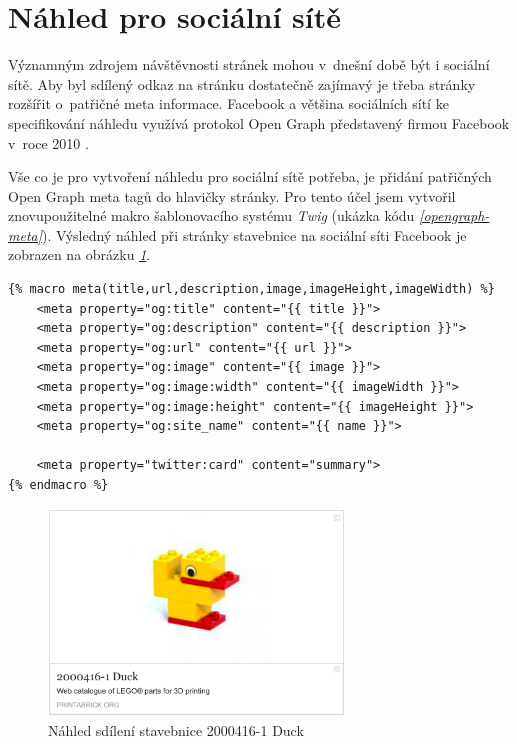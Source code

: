 \section{Náhled pro sociální sítě}
Významným zdrojem návštěvnosti stránek mohou v~dnešní době být i sociální sítě. Aby byl sdílený odkaz na stránku dostatečně zajímavý je třeba stránky rozšířit o~patřičné meta informace. Facebook a většina sociálních sítí ke specifikování náhledu využívá protokol Open Graph představený firmou Facebook v~roce 2010 \autocite{opengraph}.

Vše co je pro vytvoření náhledu pro sociální sítě potřeba, je přidání patřičných Open Graph meta tagů do hlavičky stránky. Pro tento účel jsem vytvořil znovupoužitelné makro šablonovacího systému \textit{Twig} (ukázka kódu \emph{\ref{opengraph-meta}}). Výsledný náhled při stránky stavebnice na sociální síti Facebook je zobrazen na obrázku \emph{\ref{facebook-share}}. 

\begin{listing}[htbp]
  \begin{verbatim}
{% macro meta(title,url,description,image,imageHeight,imageWidth) %}
    <meta property="og:title" content="{{ title }}">
    <meta property="og:description" content="{{ description }}">
    <meta property="og:url" content="{{ url }}">
    <meta property="og:image" content="{{ image }}">
    <meta property="og:image:width" content="{{ imageWidth }}">
    <meta property="og:image:height" content="{{ imageHeight }}">
    <meta property="og:site_name" content="{{ name }}">

    <meta property="twitter:card" content="summary">
{% endmacro %}
  \end{verbatim}
  \caption{\textit{Twig} makro pro přidání Open Graph meta tagů\label{opengraph-meta}}
\end{listing}

\begin{figure}[htbp]
      \centering
      \includegraphics[width=0.7\textwidth,height=\textheight,keepaspectratio]{images/fbshare.png}
      \caption{Náhled sdílení stavebnice 2000416-1 Duck\label{facebook-share}}
\end{figure}